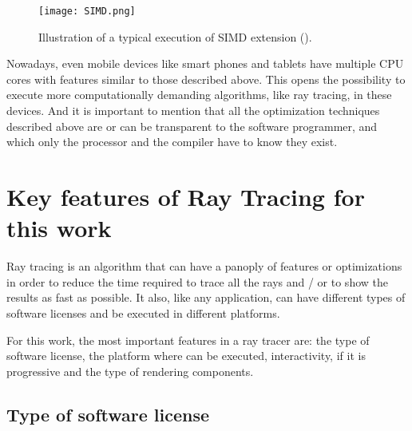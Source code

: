 \begin{figure}[H]
	\centering
	\caption{Illustration of a typical execution of SIMD extension (\cite{CPU_SIMD}).}
	\label{SIMD.}
	\texttt{[image: SIMD.png]}
\end{figure}

\par
Nowadays, even mobile devices like smart phones and tablets have multiple CPU cores with features similar to those described above.
This opens the possibility to execute more computationally demanding algorithms, like ray tracing, in these devices.
And it is important to mention that all the optimization techniques described above are or can be transparent to the software programmer, and which only the processor and the compiler have to know they exist.

\section{Key features of Ray Tracing for this work}

\par
Ray tracing is an algorithm that can have a panoply of features or optimizations in order to reduce the time required to trace all the rays and / or to show the results as fast as possible.
It also, like any application, can have different types of software licenses and be executed in different platforms.

\par
For this work, the most important features in a ray tracer are: the type of software license, the platform where can be executed, interactivity, if it is progressive and the type of rendering components.

\subsection{Type of software license}

